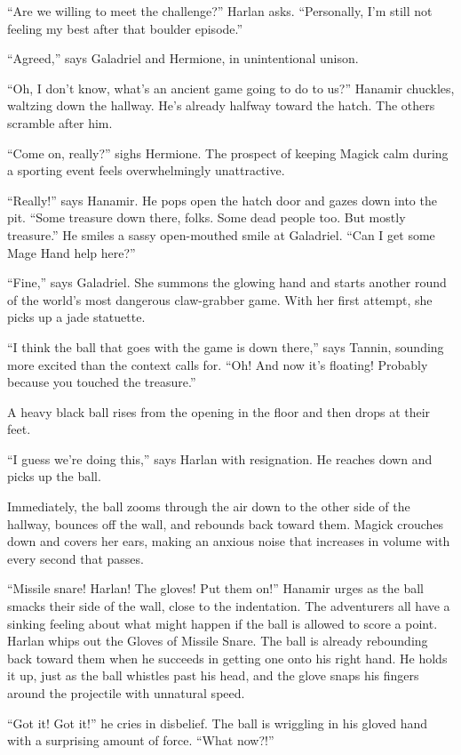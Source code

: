 \documentclass[smalldemyvopaper,11pt,twoside,onecolumn,openright,extrafontsizes]{memoir}
\newlength\drop
\begin{document}
``Are we willing to meet the challenge?'' Harlan asks. ``Personally, I'm
still not feeling my best after that boulder episode.''

``Agreed,'' says Galadriel and Hermione, in unintentional unison.

``Oh, I don't know, what's an ancient game going to do to us?'' Hanamir
chuckles, waltzing down the hallway. He's already halfway toward the
hatch. The others scramble after him.

``Come on, really?'' sighs Hermione. The prospect of keeping Magick calm
during a sporting event feels overwhelmingly unattractive.

``Really!'' says Hanamir. He pops open the hatch door and gazes down
into the pit. ``Some treasure down there, folks. Some dead people too.
But mostly treasure.'' He smiles a sassy open-mouthed smile at
Galadriel. ``Can I get some Mage Hand help here?''

``Fine,'' says Galadriel. She summons the glowing hand and starts
another round of the world's most dangerous claw-grabber game. With her
first attempt, she picks up a jade statuette.

``I think the ball that goes with the game is down there,'' says Tannin,
sounding more excited than the context calls for. ``Oh! And now it's
floating! Probably because you touched the treasure.''

A heavy black ball rises from the opening in the floor and then drops at
their feet.

``I guess we're doing this,'' says Harlan with resignation. He reaches
down and picks up the ball.

Immediately, the ball zooms through the air down to the other side of
the hallway, bounces off the wall, and rebounds back toward them. Magick
crouches down and covers her ears, making an anxious noise that
increases in volume with every second that passes.

``Missile snare! Harlan! The gloves! Put them on!'' Hanamir urges as the
ball smacks their side of the wall, close to the indentation. The
adventurers all have a sinking feeling about what might happen if the
ball is allowed to score a point. Harlan whips out the Gloves of Missile
Snare. The ball is already rebounding back toward them when he succeeds
in getting one onto his right hand. He holds it up, just as the ball
whistles past his head, and the glove snaps his fingers around the
projectile with unnatural speed.

``Got it! Got it!'' he cries in disbelief. The ball is wriggling in his
gloved hand with a surprising amount of force. ``What now?!''
\end{document}
